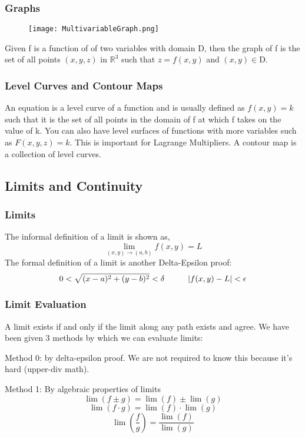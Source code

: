 \documentclass{article}
\begin{document}
\subsubsection{Graphs}
\begin{wrapfigure}{r}{0.4\textwidth}
    \centering
    \texttt{[image: MultivariableGraph.png]}
\end{wrapfigure}
Given f is a function of of two variables with domain D, then the graph of f is the set of all points $(x,y,z)\text{ in }\mathbb{R}^3$ such that $z=f(x,y)$ and $(x,y)\in$D.

\subsubsection{Level Curves and Contour Maps}
An equation is a level curve of a function and is usually defined as $f(x,y)=k$ such that it is the set of all points in the domain of f at which f takes on the value of k. You can also have level surfaces of functions with more variables such as $F(x,y,z)=k$. This is important for Lagrange Multipliers. A contour map is a collection of level curves. 

\subsection{Limits and Continuity}

\subsubsection{Limits}
The informal definition of a limit is shown as,
$$\lim_{(x,y)\to(a,b)}f(x,y) = L$$
The formal definition of a limit is another Delta-Epsilon proof:
$$0 < \sqrt{(x-a)^2+(y-b)^2} < \delta \hspace{1 cm} |f(x,y) - L|<\epsilon$$

\subsubsection{Limit Evaluation}
A limit exists if and only if the limit along any path exists and agree. We have been given 3 methods by which we can evaluate limits:

Method 0: by delta-epsilon proof. We are not required to know this because it's hard (upper-div math).

Method 1: By algebraic properties of limits
$$\lim(f \pm g) = \lim(f) \pm \lim(g)$$
$$\lim(f\cdot g) = \lim(f) \cdot \lim(g)$$
$$\lim{\left( \frac{f}{g} \right)} = \frac{\lim(f)}{\lim(g)}$$
\end{document}
